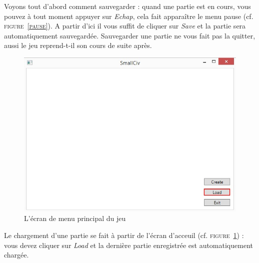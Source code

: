 Voyons tout d'abord comment sauvegarder : quand une partie est en cours, vous pouvez à tout moment appuyer sur \emph{Echap}, cela fait apparaître le menu pause (cf. \textsc{figure~\ref{pause}}). A partir d'ici il vous suffit de cliquer sur \emph{Save} et la partie sera automatiquement sauvegardée. Sauvegarder une partie ne vous fait pas la quitter, aussi le jeu reprend-t-il son cours de suite après. \newline

\begin{figure}[h]
	\centering
	\includegraphics{img/acceuil_to_load.jpg}
	\caption{L'écran de menu principal du jeu}
	\label{start2}
\end{figure}
Le chargement d'une partie se fait à partir de l'écran d'acceuil (cf. \textsc{figure~\ref{start2}}) : vous devez cliquer sur \emph{Load} et la dernière partie enregistrée est automatiquement chargée. 

